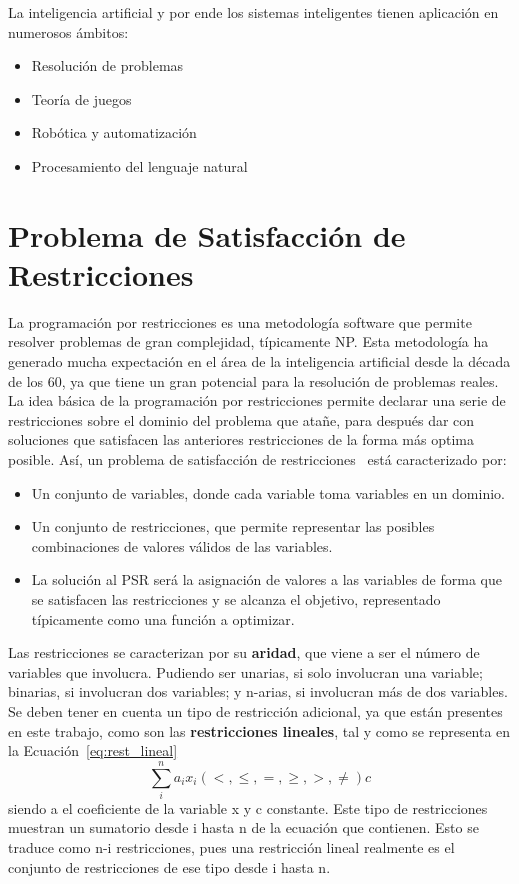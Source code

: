 La inteligencia artificial y por ende los sistemas inteligentes tienen aplicación en numerosos ámbitos:
\begin{itemize}
\item{Resolución de problemas}
\item{Teoría de juegos}
\item{Robótica y automatización}
\item{Procesamiento del lenguaje natural}
\end{itemize}

\section{Problema de Satisfacción de Restricciones}
La programación por restricciones es una metodología software que permite resolver problemas de gran complejidad, típicamente NP. Esta metodología ha generado mucha expectación en el área de la inteligencia artificial desde la década de los 60, ya que tiene un gran potencial para la resolución de problemas reales. La idea básica de la programación por restricciones permite declarar una serie de restricciones sobre el dominio del problema que atañe, para después dar con soluciones que satisfacen las anteriores restricciones de la forma más optima posible. Así, un problema de satisfacción de restricciones~\cite{Russ06} está caracterizado por:
\begin{itemize}
	\item Un conjunto de variables, donde cada variable toma variables en un dominio.
	\item Un conjunto de restricciones, que permite representar las posibles combinaciones de valores válidos de las variables.
	\item La solución al \gls{PSR} será la asignación de valores a las variables de forma que se satisfacen las restricciones y se alcanza el objetivo, representado típicamente como una función a optimizar.
\end{itemize}
Las restricciones se caracterizan por su \textbf{aridad}, que viene a ser el número de variables que involucra. Pudiendo ser unarias, si solo involucran una variable; binarias, si involucran dos variables; y n-arias, si involucran más de dos variables. Se deben tener en cuenta un tipo de restricción adicional, ya que están presentes en este trabajo, como son las \textbf{restricciones lineales}, tal y como se representa en la Ecuación~\ref{eq:rest_lineal}
\begin{equation}
  \label{eq:rest_lineal}
  \sum_{i}^{n} a_{i}x_{i} (<,\leq,=,\geq,>,\neq) c
\end{equation}
siendo a el coeficiente de la variable x y c constante. Este tipo de restricciones muestran un sumatorio desde i hasta n de la ecuación que contienen. Esto se traduce como n-i restricciones, pues una restricción lineal realmente es el conjunto de restricciones de ese tipo desde i hasta n.\\
